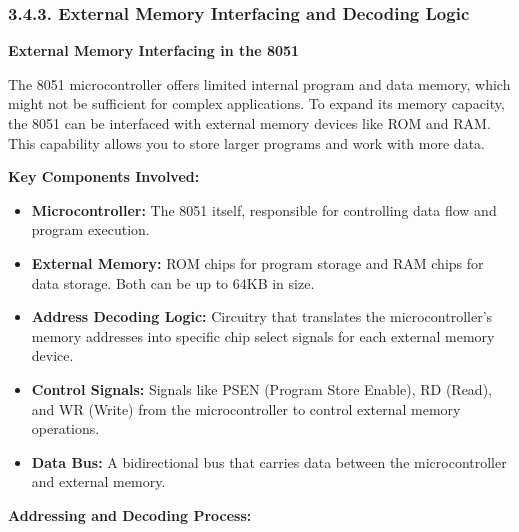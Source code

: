 \documentclass[
]{article}
\begin{document}
\hypertarget{343-external-memory-interfacing-and-decoding-logic}{%
\subsubsection{3.4.3. External Memory Interfacing and Decoding
Logic}\label{343-external-memory-interfacing-and-decoding-logic}}

\textbf{External Memory Interfacing in the 8051}

The 8051 microcontroller offers limited internal program and data
memory, which might not be sufficient for complex applications. To
expand its memory capacity, the 8051 can be interfaced with external
memory devices like ROM and RAM. This capability allows you to store
larger programs and work with more data.

\textbf{Key Components Involved:}

\begin{itemize}
\item
  \textbf{Microcontroller:} The 8051 itself, responsible for controlling
  data flow and program execution.
\item
  \textbf{External Memory:} ROM chips for program storage and RAM chips
  for data storage. Both can be up to 64KB in size.
\item
  \textbf{Address Decoding Logic:} Circuitry that translates the
  microcontroller's memory addresses into specific chip select signals
  for each external memory device.
\item
  \textbf{Control Signals:} Signals like PSEN (Program Store Enable), RD
  (Read), and WR (Write) from the microcontroller to control external
  memory operations.
\item
  \textbf{Data Bus:} A bidirectional bus that carries data between the
  microcontroller and external memory.
\end{itemize}

\textbf{Addressing and Decoding Process:}
\end{document}
